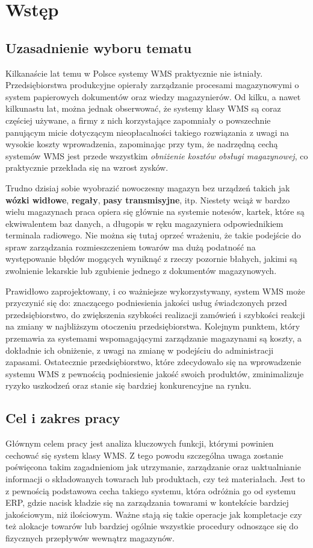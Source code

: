 \chapter{Wstęp}
\label{c1:c1}

\section{Uzasadnienie wyboru tematu}
	Kilkanaście lat temu w Polsce systemy WMS praktycznie nie istniały. Przedsiębiorstwa
	produkcyjne opierały zarządzanie procesami magazynowymi o system papierowych dokumentów
	oraz wiedzy magazynierów. Od kilku, a nawet kilkunastu lat, można jednak obserwować, że
	systemy klasy WMS są coraz częściej używane, a firmy z nich korzystające zapomniały 
	o powszechnie panującym micie dotyczącym nieopłacalności takiego rozwiązania z uwagi na wysokie 
	koszty wprowadzenia, zapominając przy tym, że nadrzędną cechą systemów WMS jest
	przede wszystkim \emph{obniżenie kosztów obsługi magazynowej}, co praktycznie przekłada się na wzrost 
	zysków.
	
	Trudno dzisiaj sobie wyobrazić nowoczesny magazyn bez urządzeń takich jak \textbf{wózki widłowe}, 
	\textbf{regały}, \textbf{pasy transmisyjne}, itp. Niestety wciąż w bardzo wielu magazynach praca 
	opiera się głównie na systemie notesów, kartek, które 
	są ekwiwalentem baz danych, a długopis w ręku magazyniera odpowiednikiem terminala radiowego. Nie 
	można się tutaj oprzeć wrażeniu, że takie podejście do spraw zarządzania rozmieszczeniem towarów
	ma dużą podatność na występowanie błędów mogących wyniknąć z rzeczy pozornie błahych, jakimi są
	zwolnienie lekarskie lub zgubienie jednego z dokumentów magazynowych.
	
	Prawidłowo zaprojektowany, i co ważniejsze wykorzystywany, system WMS może przyczynić się do:
	znaczącego podniesienia jakości usług świadczonych przed przedsiębiorstwo, do zwiększenia
	szybkości realizacji zamówień i szybkości reakcji na zmiany w najbliższym otoczeniu
	przedsiębiorstwa. Kolejnym punktem, który przemawia za systemami wspomagającymi 
	zarządzanie magazynami są koszty, a dokładnie ich obniżenie, z uwagi na zmianę w podejściu 
	do administracji zapasami. Ostatecznie przedsiębiorstwo, które zdecydowało się na wprowadzenie
	systemu WMS z pewnością podniesienie jakość swoich produktów, zminimalizuje ryzyko
	uszkodzeń oraz stanie się bardziej konkurencyjne na rynku.
	\pagebreak	
\section{Cel i zakres pracy}
	Głównym celem pracy jest analiza kluczowych funkcji, którymi powinien cechować
	się system klasy WMS. Z tego powodu szczególna uwaga zostanie poświęcona takim
	zagadnieniom jak utrzymanie, zarządzanie oraz uaktualnianie informacji o 
	składowanych towarach lub produktach, czy też materiałach. Jest to z pewnością
	podstawowa cecha takiego systemu, która odróżnia go od systemu ERP, gdzie nacisk
	kładzie się na zarządzania towarami w kontekście bardziej jakościowym, niż
	ilościowym. Ważne stają się takie operacje jak kompletacje czy też alokacje towarów
	lub bardziej ogólnie wszystkie procedury odnoszące się do fizycznych przepływów
	wewnątrz magazynów.
	 

